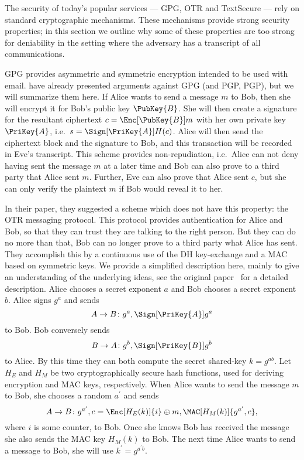 The security of today's popular services --- \ac{GPG}, \ac{OTR} and TextSecure 
--- rely on standard cryptographic mechanisms.
These mechanisms provide strong security properties;
in this section we outline why some of these properties are too strong for 
deniability in the setting where the adversary has a transcript of all 
communications.

\ac{GPG} provides asymmetric and symmetric encryption intended to be used with 
email.
\citet{otr2004} have already presented arguments against \ac{GPG} (and 
\acl{PGP}, \acs{PGP}), but we will summarize them here.
If Alice wants to send a message \(m\) to Bob, then she will encrypt it for 
Bob's public key \(\PubKey{B}\).
She will then create a signature for the resultant ciphertext \(c 
  = \Enc[\PubKey{B}]{ m }\) with her own private key \(\PriKey{A}\), i.e.~\(s 
  = \Sign[\PriKey{A}]{ H(c) }\).
Alice will then send the ciphertext block and the signature to Bob, and this 
transaction will be recorded in Eve's transcript.
This scheme provides non-repudiation, i.e.~Alice can not deny having sent the 
message \(m\) at a later time and Bob can also prove to a third party that 
Alice sent \(m\).
Further, Eve can also prove that Alice sent \(c\), but she can only verify the 
plaintext \(m\) if Bob would reveal it to her.

In their paper, they suggested a scheme which does not have this property: the 
\ac{OTR} messaging protocol.
This protocol provides authentication for Alice and Bob, so that they can trust 
they are talking to the right person.
But they can do no more than that, Bob can no longer prove to a third party 
what Alice has sent.
They accomplish this by a continuous use of the \ac{DH} key-exchange and 
a \ac{MAC} based on symmetric keys.
We provide a simplified description here, mainly to give an understanding of 
the underlying ideas, see the original paper~\cite{otr2004} for a detailed 
description.
Alice chooses a secret exponent \(a\) and Bob chooses a secret exponent \(b\).
Alice signs \(g^a\) and sends \[
  A\to B\colon g^a, \Sign[\PriKey{A}]{ g^a }
\] to Bob.
Bob conversely sends \[%
  B\to A\colon g^b, \Sign[\PriKey{B}]{ g^b }
\] to Alice.
By this time they can both compute the secret shared-key \(k = g^{ab}\).
Let \(H_E\) and \(H_M\) be two cryptographically secure hash functions, used 
for deriving encryption and \ac{MAC} keys, respectively.
When Alice wants to send the message \(m\) to Bob, she chooses a random 
\(a^\prime\) and sends \[
  A\to B\colon g^{a^\prime}, c = \Enc[H_E( k )]{ i }\oplus m,
  \MAC[H_M( k )]{ g^{a^\prime}, c },
\] where \(i\) is some counter, to Bob.
Once she knows Bob has received the message she also sends the \ac{MAC} key 
\(H_M( k )\) to Bob.
The next time Alice wants to send a message to Bob, she will use \(k^\prime 
= g^{a^\prime b}\).

